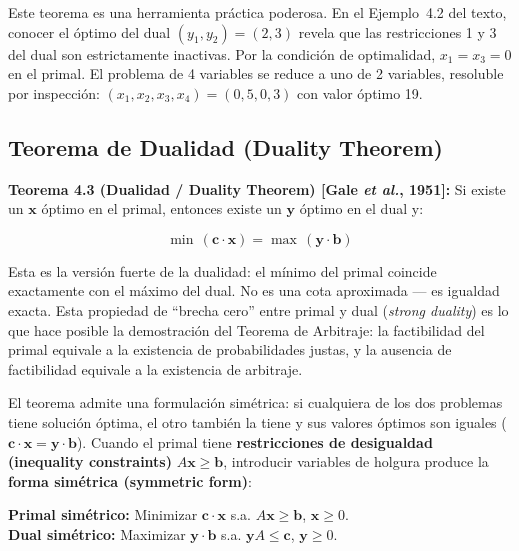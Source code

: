 \documentclass[12pt]{article}
\begin{document}
\begin{intuicion}
Este teorema es una herramienta pr\'actica poderosa. En el Ejemplo~4.2 del
texto, conocer el \'optimo del dual $(y_1, y_2) = (2,3)$ revela que las
restricciones 1 y 3 del dual son estrictamente inactivas. Por la condici\'on
de optimalidad, $x_1 = x_3 = 0$ en el primal. El problema de 4 variables se
reduce a uno de 2 variables, resoluble por inspecci\'on: $(x_1, x_2, x_3, x_4)
= (0, 5, 0, 3)$ con valor \'optimo 19.
\end{intuicion}

\subsection{Teorema de Dualidad (Duality Theorem)}

\textbf{Teorema 4.3 (Dualidad / Duality Theorem) [Gale \textit{et al.}, 1951]:}
Si existe un $\mathbf{x}$ \'optimo en el primal, entonces existe un $\mathbf{y}$
\'optimo en el dual y:

\begin{equation}
  \min\,(\mathbf{c} \cdot \mathbf{x}) = \max\,(\mathbf{y} \cdot \mathbf{b})
\end{equation}

\begin{intuicionmat}
Esta es la versi\'on fuerte de la dualidad: el m\'inimo del primal coincide
exactamente con el m\'aximo del dual. No es una cota aproximada --- es igualdad
exacta. Esta propiedad de ``brecha cero'' entre primal y dual (\textit{strong
duality}) es lo que hace posible la demostraci\'on del Teorema de Arbitraje:
la factibilidad del primal equivale a la existencia de probabilidades justas,
y la ausencia de factibilidad equivale a la existencia de arbitraje.
\end{intuicionmat}

El teorema admite una formulaci\'on sim\'etrica: si cualquiera de los dos
problemas tiene soluci\'on \'optima, el otro tambi\'en la tiene y sus valores
\'optimos son iguales ($\mathbf{c} \cdot \mathbf{x} = \mathbf{y} \cdot \mathbf{b}$).
Cuando el primal tiene \textbf{restricciones de desigualdad (inequality
constraints)} $A\mathbf{x} \geq \mathbf{b}$, introducir variables de holgura
produce la \textbf{forma sim\'etrica (symmetric form)}:

\medskip
\noindent\textbf{Primal sim\'etrico:} Minimizar $\mathbf{c} \cdot \mathbf{x}$
s.a. $A\mathbf{x} \geq \mathbf{b}$, $\mathbf{x} \geq 0$.\\
\textbf{Dual sim\'etrico:} Maximizar $\mathbf{y} \cdot \mathbf{b}$ s.a.
$\mathbf{y}A \leq \mathbf{c}$, $\mathbf{y} \geq 0$.
\medskip
\end{document}
